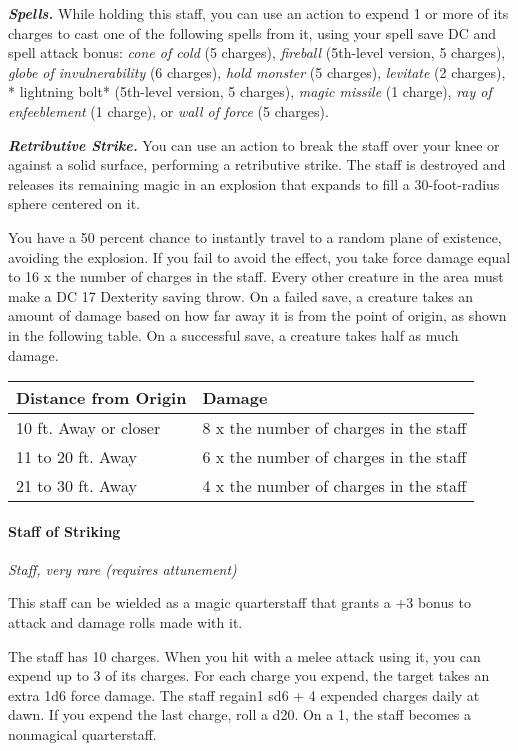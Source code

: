 \documentclass[
]{article}
\begin{document}
\emph{\textbf{Spells.}} While holding this staff, you can use an action
to expend 1 or more of its charges to cast one of the following spells
from it, using your spell save DC and spell attack bonus: \emph{cone of
cold} (5 charges), \emph{fireball} (5th-level version, 5 charges),
\emph{globe of invulnerability} (6 charges), \emph{hold monster} (5
charges), \emph{levitate} (2 charges), * lightning bolt* (5th-level
version, 5 charges), \emph{magic missile} (1 charge), \emph{ray of
enfeeblement} (1 charge), or \emph{wall of force} (5 charges).

\emph{\textbf{Retributive Strike.}} You can use an action to break the
staff over your knee or against a solid surface, performing a
retributive strike. The staff is destroyed and releases its remaining
magic in an explosion that expands to fill a 30-foot-radius sphere
centered on it.

You have a 50 percent chance to instantly travel to a random plane of
existence, avoiding the explosion. If you fail to avoid the effect, you
take force damage equal to 16 x the number of charges in the staff.
Every other creature in the area must make a DC 17 Dexterity saving
throw. On a failed save, a creature takes an amount of damage based on
how far away it is from the point of origin, as shown in the following
table. On a successful save, a creature takes half as much damage.

\begin{longtable}[]{@{}ll@{}}
\toprule
Distance from Origin & Damage\tabularnewline
\midrule
\endhead
10 ft. Away or closer & 8 x the number of charges in the
staff\tabularnewline
11 to 20 ft. Away & 6 x the number of charges in the
staff\tabularnewline
21 to 30 ft. Away & 4 x the number of charges in the
staff\tabularnewline
\bottomrule
\end{longtable}

\hypertarget{staff-of-striking}{%
\paragraph{Staff of Striking}\label{staff-of-striking}}

\emph{Staff, very rare (requires attunement)}

This staff can be wielded as a magic quarterstaff that grants a +3 bonus
to attack and damage rolls made with it.

The staff has 10 charges. When you hit with a melee attack using it, you
can expend up to 3 of its charges. For each charge you expend, the
target takes an extra 1d6 force damage. The staff regain1 sd6 + 4
expended charges daily at dawn. If you expend the last charge, roll a
d20. On a 1, the staff becomes a nonmagical quarterstaff.
\end{document}
